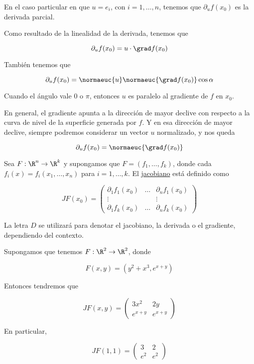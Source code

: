 En el caso particular en que $u = e_i$, con $i = 1, \dots, n$, tenemos que $\partial_u f(x_0)$ es la derivada parcial.

\begin{prop}
    Como resultado de la linealidad de la derivada, tenemos que
    
    \[
    \partial_u f(x_0) = u \cdot \grad f(x_0)
    \]
    
    También tenemos que
    
    \[
    \partial_u f(x_0) = \normaeuc{u} \normaeuc{\grad f(x_0)} \cos \alpha
    \]
    
    Cuando el ángulo vale $0$ o $\pi$, entonces $u$ es paralelo al gradiente de $f$ en $x_0$.
    
    En general, el gradiente apunta a la dirección de mayor declive con respecto a la curva de nivel de la superficie generada por $f$. Y en esa dirección de mayor declive, siempre podremos considerar un vector $u$ normalizado, y nos queda
    
    \[
    \partial_u f(x_0) = \normaeuc{\grad f(x_0)}
    \]
\end{prop}

\begin{defn}
    Sea $F: \R^n \rightarrow \R^k$ y supongamos que $F = (f_1, \dots, f_k)$, donde cada $f_i(x) = f_i(x_1, \dots, x_n)$ para $i = 1, \dots, k$. El \ul{jacobiano} está definido como
    
    \[
    JF(x_0) =
    \begin{pmatrix}
        \partial_1 f_1(x_0) & \dots & \partial_n f_1(x_0) \\
        \vdots & & \vdots \\
        \partial_1 f_k(x_0) & \dots & \partial_n f_k(x_0)
    \end{pmatrix}
    \]
\end{defn}

\begin{nota}
    La letra $D$ se utilizará para denotar el jacobiano, la derivada o el gradiente, dependiendo del contexto.
\end{nota}

\begin{ejem}
    Supongamos que tenemos $F: \R^2 \rightarrow \R^2$, donde
    
    \[
    F(x, y) = \left( y^2 + x^3, e^{x+y} \right)
    \]
    
    Entonces tendremos que
    
    \[
    JF(x,y) =
    \begin{pmatrix}
        3x^2    & 2y \\
        e^{x+y} & e^{x+y}
    \end{pmatrix}
    \]
    
    En particular,
    
    \[
    JF(1,1) =
    \begin{pmatrix}
        3   & 2 \\
        e^2 & e^2
    \end{pmatrix}
    \]
\end{ejem}

